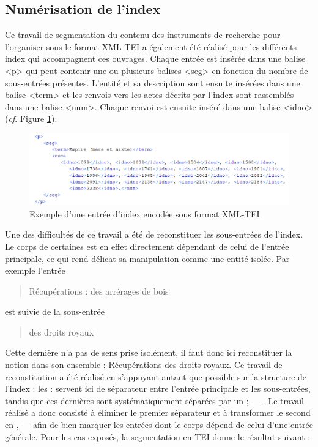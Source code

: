 \documentclass[a4paper,12pt,twoside]{book}
\begin{document}
	\subsection{Numérisation de l’index}

	Ce travail de segmentation du contenu des instruments de recherche pour l'organiser sous le format XML-TEI a également été réalisé pour les différents index qui accompagnent ces ouvrages. Chaque entrée est insérée dans une balise <p> qui peut contenir une ou plusieurs balises <seg> en fonction du nombre de sous-entrées présentes. L'entité et sa description sont ensuite insérées dans une balise <term> et les renvois vers les actes décrits par l'index sont rassemblés dans une balise <num>. Chaque renvoi est ensuite inséré dans une balise <idno> (\textit{cf}. Figure \ref{index_TEI}).
	
	\begin{figure}
		\centering
		\includegraphics[width=\textwidth]{Images/index_en_TEI.png}
		\caption{Exemple d'une entrée d'index encodée sous format XML-TEI.}
		\label{index_TEI}
	\end{figure} 
	
	Une des difficultés de ce travail a été de reconstituer les sous-entrées de l'index. Le corps de certaines est en effet directement dépendant de celui de l'entrée principale, ce qui rend délicat sa manipulation comme une entité isolée. Par exemple l'entrée
	
	\begin{quotation}
		Récupérations : des arrérages de bois
	\end{quotation}

	\noindent est suivie de la sous-entrée
	
	\begin{quotation}
		des droits royaux
	\end{quotation}

	\noindent Cette dernière n'a pas de sens prise isolément, il faut donc ici reconstituer la notion dans son ensemble : \og Récupérations des droits royaux\fg{}. Ce travail de reconstitution a été réalisé en s'appuyant autant que possible sur la structure de l'index : les \og :\fg{} servent ici de séparateur entre l'entrée principale et les sous-entrées, tandis que ces dernières sont systématiquement séparées par un \og ; — \fg{}. Le travail réalisé a donc consisté à éliminer le premier séparateur et à transformer le second en \og{}  , — \fg{} afin de bien marquer les entrées dont le corps dépend de celui d'une entrée générale. Pour les cas exposés, la segmentation en TEI donne le résultat suivant :
	
\end{document}
